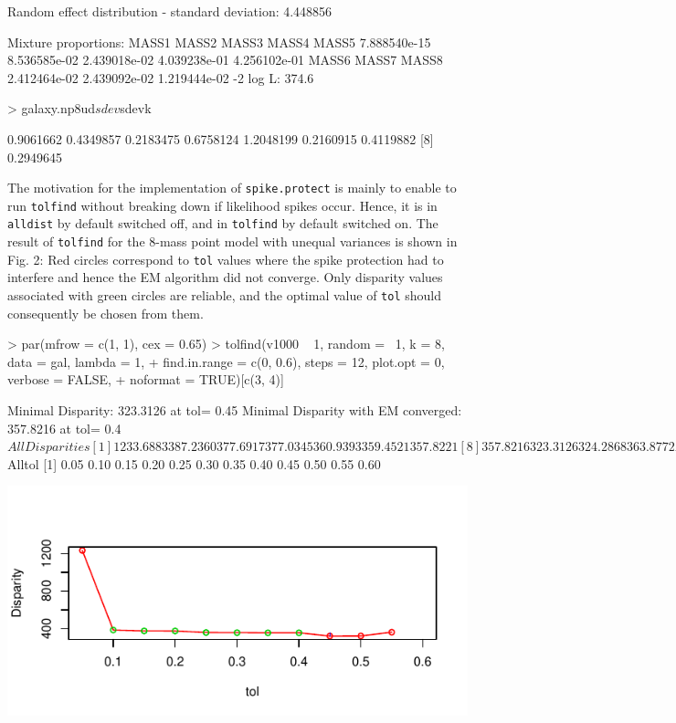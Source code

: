 \documentclass[a4paper]{article}
\begin{document}
\begin{landscape}
\begin{Schunk}
\begin{Soutput}
Random effect distribution - standard deviation:	   4.448856 

Mixture proportions:
       MASS1         MASS2         MASS3         MASS4         MASS5  
7.888540e-15  8.536585e-02  2.439018e-02  4.039238e-01  4.256102e-01  
       MASS6         MASS7         MASS8  
2.412464e-02  2.439092e-02  1.219444e-02  
-2 log L:	    374.6 
\end{Soutput}
\begin{Sinput}
> galaxy.np8ud$sdev$sdevk
\end{Sinput}
\begin{Soutput}
[1] 0.9061662 0.4349857 0.2183475 0.6758124 1.2048199 0.2160915 0.4119882
[8] 0.2949645
\end{Soutput}
\end{Schunk}
The motivation for the implementation of {\tt spike.protect} is mainly to enable to run {\tt tolfind}
without breaking down if likelihood spikes occur. Hence, it is in {\tt alldist} by default switched off, 
and in {\tt tolfind} by default switched on.  The result of {\tt tolfind} for the 8-mass point model with unequal variances 
is shown in Fig. 2: Red circles correspond to {\tt tol} values where the spike protection had to interfere and
 hence the EM algorithm did not converge. Only disparity values associated with green circles are reliable, 
 and the  optimal value of {\tt tol} should consequently be chosen from them.
 
 \begin{minipage}{21cm}
\begin{Schunk}
\begin{Sinput}
> par(mfrow = c(1, 1), cex = 0.65)
> tolfind(v1000 ~ 1, random = ~1, k = 8, data = gal, lambda = 1, 
+     find.in.range = c(0, 0.6), steps = 12, plot.opt = 0, verbose = FALSE, 
+     noformat = TRUE)[c(3, 4)]
\end{Sinput}
\begin{Soutput}
Minimal Disparity: 323.3126 at tol= 0.45 
Minimal Disparity with EM converged: 357.8216 at tol= 0.4 
$AllDisparities
 [1] 1233.6883  387.2360  377.6917  377.0345  360.9393  359.4521  357.8221
 [8]  357.8216  323.3126  324.2868  363.8772       Inf

$Alltol
 [1] 0.05 0.10 0.15 0.20 0.25 0.30 0.35 0.40 0.45 0.50 0.55 0.60
\end{Soutput}
\end{Schunk}
\includegraphics{npmlreg-v-015}


\end{minipage}
\end{landscape}
\end{document}
